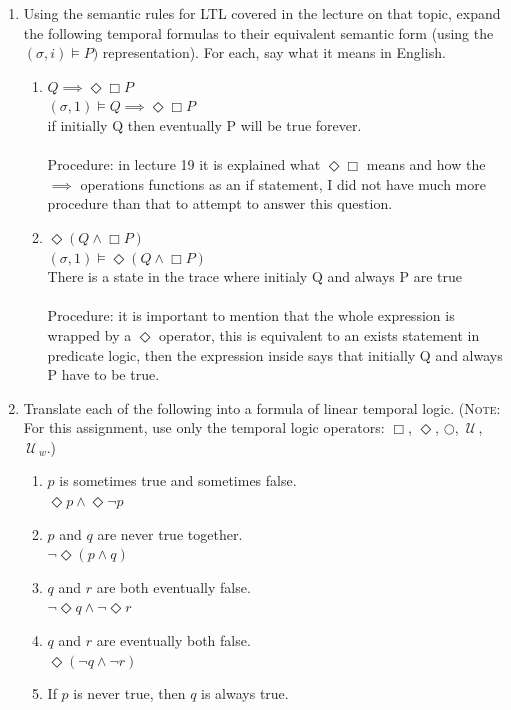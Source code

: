\documentclass{article}
\newcommand{\Until}{\,\mathcal{U}\,}
\newcommand{\Next}{\bigcirc}
\begin{document}
\begin{enumerate}
\item Using the semantic rules for LTL covered in the lecture on that topic, expand the following temporal formulas to their equivalent semantic form (using the $(\sigma,i)\models P)$  representation). For each, say what it means in English.
\begin{enumerate}
\item $Q \implies \Diamond \Box P$ \\
  $(\sigma,1)\models Q \implies \Diamond \Box P$ \\
  if initially Q then eventually P will be true forever. \\
  \\
  Procedure: in lecture 19 it is explained what $\Diamond \Box$ means and how the $\implies$
  operations functions as an if statement, I did not have much more procedure than that to attempt to answer this question.
\item $\Diamond (Q \land \Box P)$ \\
  $(\sigma,1)\models \Diamond ( Q \land \Box P)$ \\
  There is a state in the trace where initialy Q and always P are true \\
  \\
  Procedure: it is important to mention that the whole expression is wrapped by a $\Diamond$ operator, this is equivalent to an exists statement in predicate logic, then the expression inside says that initially Q and always P have to be true.
\end{enumerate}
\item Translate each of the following into a formula of linear temporal logic. (\textsc{Note}: For this assignment, use only the temporal logic operators: $\Box$, $\Diamond$, $\Next$, $\Until$, $\Until_w$.)
\begin{enumerate}
\item $p$ is sometimes true and sometimes false. \\
$ \Diamond p \land \Diamond \neg p $
\item $p$ and $q$ are never true together. \\
$ \neg \Diamond ( p \land q) $
\item $q$ and $r$ are both eventually false. \\
$ \neg \Diamond q \land \neg \Diamond r $  
\item $q$ and $r$ are eventually both false. \\
$ \Diamond (\neg q \land \neg r) $  
\item If $p$ is never true, then $q$ is always true. \\

\end{enumerate}
\end{enumerate}
\end{document}
